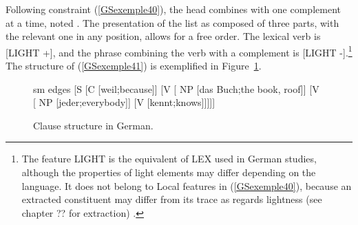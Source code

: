 \documentclass[output=paper
                ,modfonts
                ,nonflat
	        ,collection
	        ,collectionchapter
	        ,collectiontoclongg
 	        ,biblatex
                ,babelshorthands
                ,newtxmath
                ,draftmode
                ,colorlinks, citecolor=brown
]{./langsci/langscibook}
\begin{document}
{\begin{exe}
\end{exe}

Following constraint (\ref{GSexemple40}), the head combines with one complement at a time, noted . The presentation of the list as composed of three parts, with the relevant one in any position, allows for a free order. The lexical verb is [LIGHT +], and the phrase combining the verb with a complement is [LIGHT -].\footnote{The feature LIGHT is the equivalent of LEX used in German studies, although the properties of light elements may differ depending on the language. It does not belong to Local features in (\ref{GSexemple40}), because an extracted constituent may differ from its trace as regards lightness (see chapter ?? for extraction) \citep{muller2018clause}.} The structure of (\ref{GSexemple41}) is exemplified in Figure~\ref{GSfigure10}.


\z


\begin{figure}
    \centering
	\begin{forest}
	sm edges
 	[S 
    [C [weil;because]]
    [V  
        [ NP [das Buch;the book, roof]]    
        [V  
            [ NP [jeder;everybody]]
            [V  [kennt;knows]]]]]
\end{forest}
    \caption{Clause structure in German.}
    \label{GSfigure10}
\end{figure}


}
\end{document}
